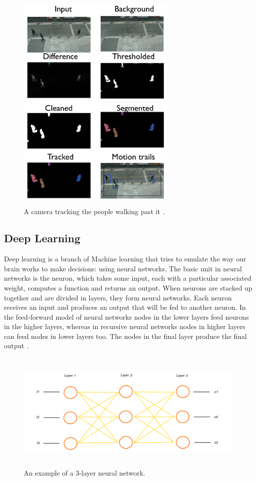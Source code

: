 \documentclass{l4proj}
\begin{document}
\vspace{10mm}
\begin{figure}[h!]
\centering
\includegraphics[height=11cm,width=7.7cm]{computer_vision.png}
\caption{A camera tracking the people walking past it \cite{ObjectTracking}.}
\label{Camera_tracking}
\end{figure}

\subsection{Deep Learning} \label{InceptionLabel}

Deep learning is a branch of Machine learning that tries to emulate the way our brain works to make decisions: using neural networks. The basic unit in neural networks is the neuron, which takes some input, each with a particular associated weight, computes a function and returns an output. When neurons are stacked up together and are divided in layers, they form neural networks. Each neuron receives an input and produces an output that will be fed to another neuron. In the feed-forward model of neural networks nodes in the lower layers feed neurons in the higher layers, whereas in recursive neural networks nodes in higher layers can feed nodes in lower layers too. The nodes in the final layer produce the final output \cite{DeepLearning}.

\begin{figure}[h!]
\centering
\includegraphics[height=5.8cm,width=14cm]{neural_network2.png}
\caption{An example of a 3-layer neural network.}
\label{Neural_network}
\end{figure}
\end{document}
